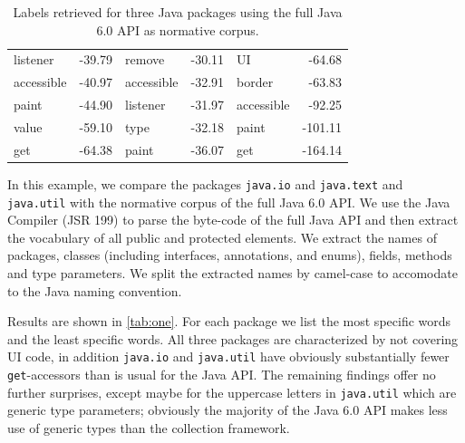 \documentclass[10pt]{book}
\begin{document}
\begin{table}
{\begin{center}
\begin{tabular}{lr | lr | lr}
listener & -39.79 & remove & -30.11 & UI & -64.68\\
accessible & -40.97 & accessible & -32.91 & border & -63.83\\
paint & -44.90 & listener & -31.97 & accessible & -92.25\\
value & -59.10 & type & -32.18 & paint & -101.11\\
get & -64.38 & paint & -36.07 & get & -164.14\\
\end{tabular}
\end{center}}
\caption{Labels retrieved for three Java packages using the full Java 6.0 API as normative corpus.}
\label{tab:one}
\end{table}%


In this example, we compare the packages \verb$java.io$ and \verb$java.text$ and \verb$java.util$ with the normative corpus of the full Java 6.0 API. We use the Java Compiler (JSR 199) to parse the byte-code of the full Java API and then extract the vocabulary of all public and protected elements. We extract the names of packages, classes (including interfaces, annotations, and enums), fields, methods and type parameters. We split the extracted names by camel-case to accomodate to the Java naming convention.

Results are shown in \autoref{tab:one}. For each package we list the most specific words and the least specific words. All three packages are characterized by not covering UI code, in addition \verb$java.io$ and \verb$java.util$ have obviously substantially fewer \verb$get$-accessors than is usual for the Java API. The remaining findings offer no further surprises, except maybe for the uppercase letters in \verb$java.util$ which are generic type parameters; obviously the majority of the Java 6.0 API makes less use of generic types than the collection framework.


\end{document}

